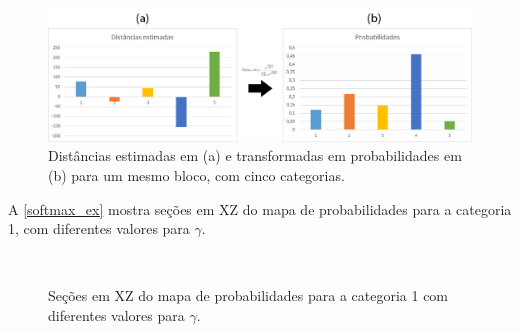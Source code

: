 \begin{figure}[H]
	\caption{\label{softmax_grafico}Distâncias estimadas em (a) e transformadas em probabilidades em (b) para um mesmo bloco, com cinco categorias.}
	\begin{center}
		\includegraphics[width=\textwidth]{capitulo_2/softmax_bars_final.jpg}
	\end{center}
\end{figure}

A \autoref{softmax_ex} mostra seções em XZ do mapa de probabilidades para a categoria 1, com diferentes valores para $\gamma$.

\begin{figure}[H]
\caption{Seções em XZ do mapa de probabilidades para a categoria 1 com diferentes valores para $\gamma$.} 
\label{softmax_ex}
\begin{center}
\\
\end{center}
\begin{center}
\end{center}
\end{figure}

